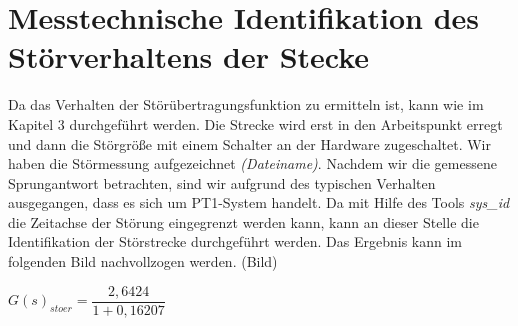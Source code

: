 
\newpage
[Perkowski]
\section{Messtechnische Identifikation des Störverhaltens der Stecke}
Da das Verhalten der Störübertragungsfunktion zu ermitteln ist, kann wie im Kapitel 3 durchgeführt werden. Die Strecke wird erst in den Arbeitspunkt erregt und dann die Störgröße mit einem Schalter an der Hardware zugeschaltet. Wir haben die Störmessung aufgezeichnet \textit{(Dateiname)}. Nachdem wir die gemessene Sprungantwort betrachten, sind wir aufgrund des typischen Verhalten ausgegangen, dass es sich um PT1-System handelt. 
Da mit Hilfe des Tools \textit{sys\_id} die Zeitachse der Störung eingegrenzt werden kann, kann an dieser Stelle die Identifikation der Störstrecke durchgeführt werden. Das Ergebnis kann im folgenden Bild nachvollzogen werden. (Bild)

$ G(s)_{stoer} = \dfrac{2,6424}{1 + 0,16207} $